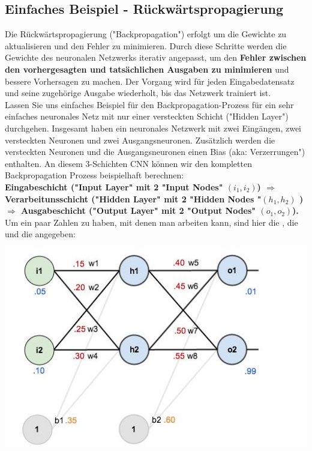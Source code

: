 \documentclass[12pt]{article}
\begin{document}
\subsection{Einfaches Beispiel - Rückwärtspropagierung}
%
Die Rückwärtspropagierung ("Backpropagation") erfolgt um die Gewichte zu aktualisieren und den Fehler zu minimieren. Durch diese Schritte werden die Gewichte des neuronalen Netzwerks iterativ angepasst, um den \textbf{Fehler zwischen den vorhergesagten und tatsächlichen Ausgaben zu minimieren} und bessere Vorhersagen zu machen. Der Vorgang wird für jeden Eingabedatensatz und seine zugehörige Ausgabe wiederholt, bis das Netzwerk trainiert ist.
\\Lassen Sie uns einfaches Beispiel für den Backpropagation-Prozess für ein sehr einfaches neuronales Netz mit nur einer versteckten Schicht ("Hidden Layer") durchgehen. Insgesamt haben ein neuronales Netzwerk mit zwei Eingängen, zwei versteckten Neuronen und zwei Ausgangsneuronen. Zusätzlich werden die versteckten Neuronen und die Ausgangsneuronen einen Bias (aka: Verzerrungen") enthalten. An diesem 3-Schichten CNN können wir den kompletten Backpropagation Prozess beispielhaft berechnen:\\
\textbf{Eingabeschicht ("Input Layer" mit 2 "Input Nodes" $(i_1,i_2)$) $\Rightarrow$ Verarbeitunsschicht ("Hidden Layer" mit 2 "Hidden Nodes "$(h_1,h_2)$ ) $\Rightarrow$ Ausgabeschicht ("Output Layer" mit 2 "Output Nodes" $(o_1,o_2)$).} \\ 
Um ein paar Zahlen zu haben, mit denen man arbeiten kann, sind hier die {\color{red}{anfänglichen Gewichte}}, die {\color{orange}{Bias("Verzerrungen")}} und die {\color{blue}{Trainingsinputs/-outputs}} angegeben:\\

\begin{center}
\includegraphics{Backpropagation_Example3} 
\end{center}
\end{document}
